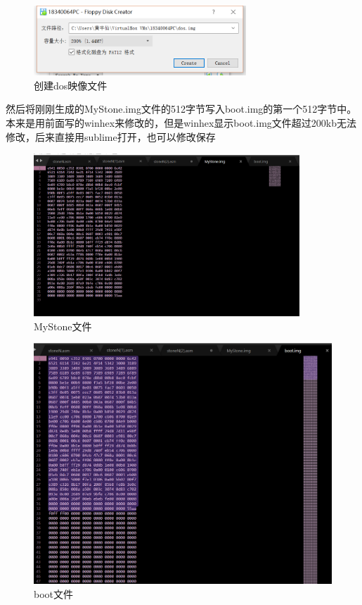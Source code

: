 \documentclass[12pt]{article}
\begin{document}
	\begin{figure}[H]
			\centering
			\includegraphics[width=8cm]{./figures/dos.png}
			\caption{创建dos映像文件} 
		\end{figure}	

然后将刚刚生成的MyStone.img文件的512字节写入boot.img的第一个512字节中。本来是用前面写的winhex来修改的，但是winhex显示boot.img文件超过200kb无法修改，后来直接用sublime打开，也可以修改保存
	\begin{figure}[H]
			\centering
			\includegraphics[width=10cm]{./figures/MyStone.png}
			\caption{MyStone文件} 
		\end{figure}	

	\begin{figure}[H]
			\centering
			\includegraphics[width=12cm]{./figures/boot.png}
			\caption{boot文件} 
		\end{figure}	
\end{document}
